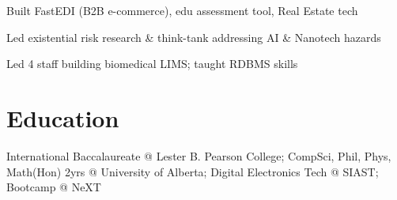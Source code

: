 \documentclass[line,margin,hidelinks]{res}
\begin{document}
\begin{resume}

\begin{position}
Built FastEDI (B2B e-commerce),
edu assessment tool,
Real Estate tech
\end{position}


\begin{position}
Led existential risk research \& think-tank addressing AI \& Nanotech hazards
\end{position}


\begin{position}
Led 4 staff building biomedical LIMS;
taught RDBMS skills
\end{position}



\section{Education}
\begin{par}
International Baccalaureate @ Lester B. Pearson College; CompSci, Phil, Phys, Math(Hon) 2yrs @ University of Alberta; Digital Electronics Tech @ SIAST; Bootcamp @ NeXT
\end{par}

\end{resume}
\end{document}
